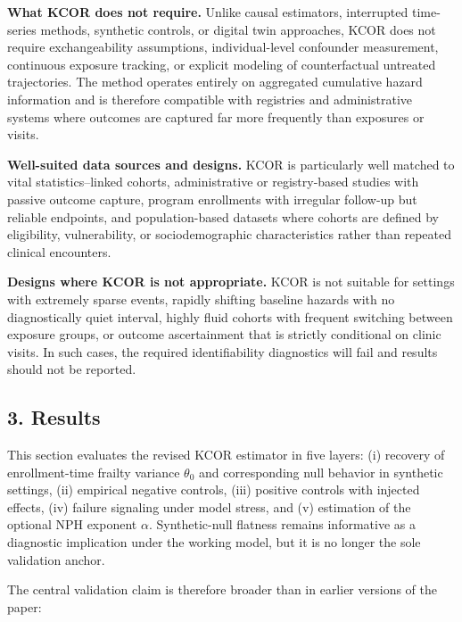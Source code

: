 \documentclass[
]{article}
\begin{document}
\textbf{What KCOR does not require.} Unlike causal estimators,
interrupted time-series methods, synthetic controls, or digital twin
approaches, KCOR does not require exchangeability assumptions,
individual-level confounder measurement, continuous exposure tracking,
or explicit modeling of counterfactual untreated trajectories. The
method operates entirely on aggregated cumulative hazard information and
is therefore compatible with registries and administrative systems where
outcomes are captured far more frequently than exposures or visits.

\textbf{Well-suited data sources and designs.} KCOR is particularly well
matched to vital statistics--linked cohorts, administrative or
registry-based studies with passive outcome capture, program enrollments
with irregular follow-up but reliable endpoints, and population-based
datasets where cohorts are defined by eligibility, vulnerability, or
sociodemographic characteristics rather than repeated clinical
encounters.

\textbf{Designs where KCOR is not appropriate.} KCOR is not suitable for
settings with extremely sparse events, rapidly shifting baseline hazards
with no diagnostically quiet interval, highly fluid cohorts with
frequent switching between exposure groups, or outcome ascertainment
that is strictly conditional on clinic visits. In such cases, the
required identifiability diagnostics will fail and results should not be
reported.

\subsection{3. Results}\label{results}

This section evaluates the revised KCOR estimator in five layers: (i)
recovery of enrollment-time frailty variance \(\theta_0\) and
corresponding null behavior in synthetic settings, (ii) empirical
negative controls, (iii) positive controls with injected effects, (iv)
failure signaling under model stress, and (v) estimation of the optional
NPH exponent \(\alpha\). Synthetic-null flatness remains informative as
a diagnostic implication under the working model, but it is no longer
the sole validation anchor.

The central validation claim is therefore broader than in earlier
versions of the paper:
\end{document}
